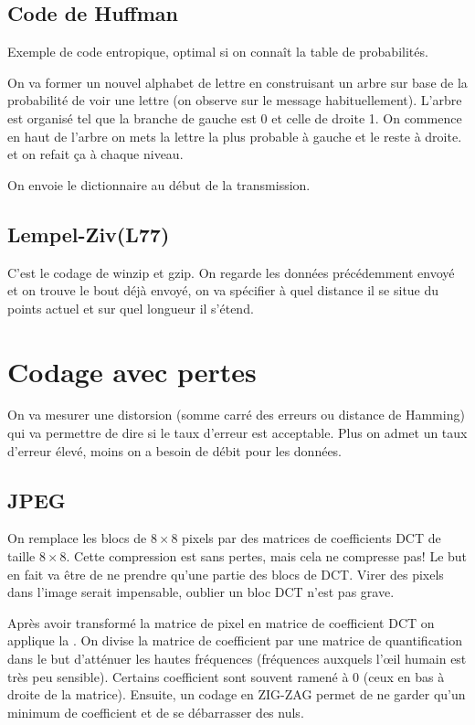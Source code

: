 \subsection{Code de Huffman}

Exemple de code entropique, optimal si on connaît la table de probabilités.

On va former un nouvel alphabet de lettre en construisant un arbre sur base de la probabilité de voir une lettre (on observe sur le message habituellement). L'arbre est organisé tel que la branche de gauche est 0 et celle de droite 1. On commence en haut de l'arbre on mets la lettre la plus probable à gauche et le reste à droite. et on refait ça à chaque niveau.

On envoie le dictionnaire au début de la transmission.

\subsection{Lempel-Ziv(L77)}

C'est le codage de winzip et gzip. On regarde les données précédemment envoyé et on trouve le bout déjà envoyé, on va spécifier à quel distance il se situe du points actuel et sur quel longueur il s'étend.

\section{Codage avec pertes}

On va mesurer une distorsion (somme carré des erreurs ou distance de Hamming) qui va permettre de dire si le taux d'erreur est acceptable. Plus on admet un taux d'erreur élevé, moins on a besoin de débit pour les données.

\newpage
\subsection{JPEG}

On remplace les blocs de $8 \times 8$ pixels par des matrices de coefficients DCT de taille $8 \times 8$. Cette compression est sans pertes, mais cela ne compresse pas! Le but en fait va être de ne prendre qu’une partie des blocs de DCT. Virer des pixels dans l'image serait impensable, oublier un bloc DCT n'est pas grave.

Après avoir transformé la matrice de pixel en matrice de coefficient DCT on applique la . On divise la matrice de coefficient par une matrice de quantification dans le but d’atténuer les hautes fréquences (fréquences auxquels l’œil humain est très peu sensible). Certains coefficient sont souvent ramené à 0 (ceux en bas à droite de la matrice). Ensuite, un codage en ZIG-ZAG permet de ne garder qu'un minimum de coefficient et de se débarrasser des nuls.

